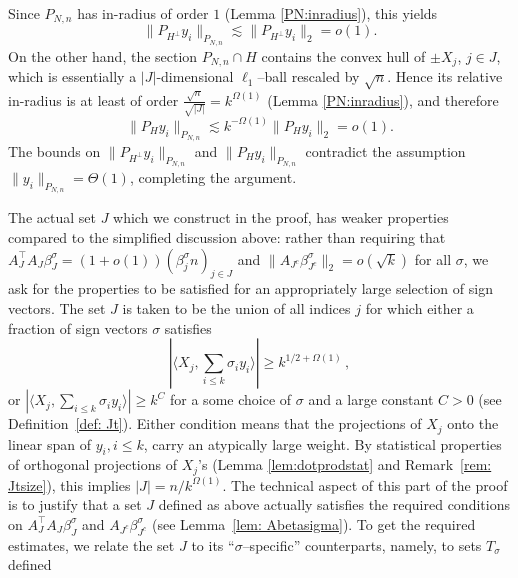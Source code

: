 \documentclass[11pt]{amsart}
\theoremstyle{definition}
\theoremstyle{plain}
\begin{document}
Since $P_{N,n}$ has in-radius of order $1$ (Lemma \ref{PN:inradius}), this yields
$$
  \|P_{H^\perp}y_i\|_{P_{N,n}} \lesssim \|P_{H^\perp}y_i\|_2=o(1).
$$
On the other hand,
the section $P_{N,n} \cap H$ contains the convex hull of $\pm X_j$, $j\in J$, which is essentially a $|J|$-dimensional $\ell_1$--ball rescaled by $\sqrt{n}$. Hence its
relative in-radius is at least of order $\frac{\sqrt{n}}{\sqrt{|J|}} = k^{\Omega(1)}$ (Lemma \ref{PN:inradius}), and therefore
$$
  \|P_H y_i\|_{P_{N,n}} \lesssim k^{-\Omega(1)} \|P_H y_i\|_2=o(1).
$$
The bounds on $\|P_{H^\perp}y_i\|_{P_{N,n}}$
and $\|P_{H}y_i\|_{P_{N,n}}$ contradict the assumption $\|y_i\|_{P_{N,n}}=\Theta(1)$,
completing the argument.

The actual set $J$ which we construct in the proof,
has weaker properties compared to the simplified discussion above:
rather than requiring that
$A_{J}^\top A_{J}\beta^\sigma_{J} =(1+o(1)) (\beta_j^\sigma n)_{j\in J}$
and $\|A_{J^c}\beta^\sigma_{J^c}\|_2=o(\sqrt{k})$ for all $\sigma$,
we ask for the properties to be satisfied for an appropriately large
selection of sign vectors.
The set $J$ is taken to be the union of all indices $j$ 
for which either a fraction of sign vectors $\sigma$ satisfies
$$
  |\langle X_j, \sum_{i\leq k} \sigma_i y_i\rangle| \ge k^{1/2+\Omega(1)}\,,
$$
or $|\langle X_j, \sum_{i\leq k} \sigma_i y_i\rangle| \ge k^C$ for a some choice of $\sigma$ and a large constant $C>0$ (see Definition~\ref{def: Jt}). Either condition means that the projections of $X_j$ onto the linear span
of $y_i, i\leq k$, carry an atypically large weight. By statistical properties of 
orthogonal projections of $X_j$'s 
(Lemma \ref{lem:dotprodstat} and Remark~\ref{rem: Jtsize}), this 
implies $|J|=n/k^{\Omega(1)}$.
The technical aspect of this part of the proof is to justify 
that a set $J$ defined as above actually satisfies the required conditions
on $A_{J}^\top A_{J}\beta^\sigma_{J}$
and $A_{J^c}\beta^\sigma_{J^c}$
(see Lemma~\ref{lem: Abetasigma}).
To get the required estimates,
we relate the set $J$
to its ``$\sigma$--specific'' counterparts,
namely, to sets $T_\sigma$ defined
\end{document}
